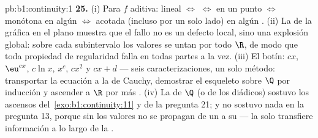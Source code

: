 \begin{solution}{pb:b1:continuity:1}
\textbf{25.} (i) Para $f$ aditiva: lineal $\iff$  $\iff$
 en un punto $\iff$ monótona en algún  $\iff$
acotada (incluso por un solo lado) en algún . (ii) La
 de la gráfica en el plano muestra que el fallo no es un
defecto local, sino una explosión global: sobre cada subintervalo los
valores se untan por todo $\R$, de modo que toda propiedad de
regularidad falla en todas partes a la vez. (iii) El botín: $cx$,
$\eu^{cx}$, $c\ln x$, $x^c$, $cx^2$ y $cx + d$ --- seis
caracterizaciones, un solo método: transportar la ecuación a la de
Cauchy, demostrar el esqueleto sobre $\Q$ por inducción y ascender a
$\R$ por  más . (iv) La  de $\Q$ (o de
los diádicos) sostuvo los ascensos del~\cref{exo:b1:continuity:11} y
de la pregunta 21; y no sostuvo nada en la pregunta 13, porque sin
 los valores no se propagan de un   a su
 --- la  solo transfiere información a lo largo de
la .
\end{solution}
